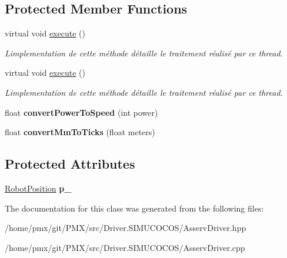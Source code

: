 \subsection*{Protected Member Functions}
\begin{DoxyCompactItemize}
\item 
\mbox{\label{classAsservDriver_ae2fdf0d75abab4e2cc974706c8a81867}} 
virtual void \hyperlink{classAsservDriver_ae2fdf0d75abab4e2cc974706c8a81867}{execute} ()
\begin{DoxyCompactList}\small\item\em L\textquotesingle{}implementation de cette méthode détaille le traitement réalisé par ce thread. \end{DoxyCompactList}\item 
\mbox{\label{classAsservDriver_a43527b66274f2c5f0e8e88adcd7cced2}} 
virtual void \hyperlink{classAsservDriver_a43527b66274f2c5f0e8e88adcd7cced2}{execute} ()
\begin{DoxyCompactList}\small\item\em L\textquotesingle{}implementation de cette méthode détaille le traitement réalisé par ce thread. \end{DoxyCompactList}\item 
\mbox{\label{classAsservDriver_a10895a322108211299951538aa2ff614}} 
float {\bfseries convert\+Power\+To\+Speed} (int power)
\item 
\mbox{\label{classAsservDriver_a05bd91c77a979511dda5d0e901ddf6e6}} 
float {\bfseries convert\+Mm\+To\+Ticks} (float meters)
\end{DoxyCompactItemize}
\subsection*{Protected Attributes}
\begin{DoxyCompactItemize}
\item 
\mbox{\label{classAsservDriver_a46204e282e8f3174a8dc42ba81f10e47}} 
\hyperlink{structRobotPosition}{Robot\+Position} {\bfseries p\+\_\+}
\end{DoxyCompactItemize}


The documentation for this class was generated from the following files\+:\begin{DoxyCompactItemize}
\item 
/home/pmx/git/\+P\+M\+X/src/\+Driver.\+S\+I\+M\+U\+C\+O\+C\+O\+S/Asserv\+Driver.\+hpp\item 
/home/pmx/git/\+P\+M\+X/src/\+Driver.\+S\+I\+M\+U\+C\+O\+C\+O\+S/Asserv\+Driver.\+cpp\end{DoxyCompactItemize}
